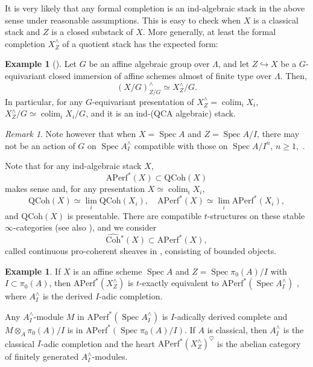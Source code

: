 \documentclass{amsart}
\theoremstyle{definition}
\newtheorem{example}[theorem]{Example}
\theoremstyle{remark}
\newtheorem{remark}[theorem]{Remark}
\numberwithin{equation}{section}
\DeclareMathOperator{\Spec}{Spec}
\DeclareMathOperator{\colim}{colim}
\newcommand{\wh}{\widehat}
\newcommand{\QCoh}{\mathrm{QCoh}}
\newcommand{\Coh}{\mathrm{Coh}}
\newcommand{\Aperf}{\mathrm{APerf}}
\begin{document}
It is very likely that any formal completion is an ind-algebraic stack in the above sense under reasonable assumptions. This is easy to check when $X$ is a classical stack and $Z$ is a closed substack of $X$. More generally, at least the formal completion $X^\wedge_Z$ of a quotient stack has the expected form:

\begin{example}[{\cite[Proposition 7.1.16]{ElmantoKubrakSosnilo}}]
Let $G$ be an affine algebraic group over $\Lambda$, and let $Z\hookrightarrow X$ be a $G$-equivariant closed immersion of affine schemes almost of finite type over $\Lambda$. Then, 
\[
(X/G)^\wedge_{Z/G} \simeq X^\wedge_Z/G.  
\]
In particular, for any $G$-equivariant presentation of $X^\wedge_Z=\colim_i X_i$, $X^\wedge_Z/G\simeq \colim_i X_i/G$, and it is an ind-(QCA algebraic) stack. 
\end{example}

\begin{remark}
Note however that when $X=\Spec A$ and $Z=\Spec A/I$, there may not be an action of $G$ on $\Spec A^\wedge_I$ compatible with those on $\Spec A/I^n$, $n\geq 1$,~\cite[footnote 6]{chendhillon}. 
\end{remark}

Note that for any ind-algebraic stack $X$, 
\[
\Aperf^* (X) \subset \QCoh(X)
\]
makes sense and, for any presentation $X\simeq \colim_i X_i$, 
\[
\QCoh(X)\simeq \lim_i \QCoh(X_i), \quad \Aperf^*(X)\simeq \lim_i\Aperf^*(X_i), 
\]
and $\QCoh(X)$ is presentable. There are compatible $t$-structures on these stable $\infty$-categories (see also \cite[Proposition 2.1.11]{HalpernLeistnerPreygel}), and we consider 
\[
\wh{\Coh}{}^*(X)\subset \Aperf^*(X),
\]
called continuous pro-coherent sheaves in \cite{chendhillon}, consisting of bounded objects. 

\begin{example}
If $X$ is an affine scheme $\Spec A$ and $Z=\Spec \pi_0(A)/I$ with $I\subset \pi_0(A)$, then $\Aperf^*(X^\wedge_Z)$ is $t$-exactly equivalent to $\Aperf^*(\Spec A^\wedge_I)$ \cite[Lemma 2.1.10]{HalpernLeistnerPreygel}, where $A^\wedge_I$ is the derived $I$-adic completion. 

Any $A^\wedge_I$-module $M$ in $\Aperf^*(\Spec A^\wedge_I)$ is $I$-adically derived complete and $M\otimes_A \pi_0(A)/I$ is in $\Aperf^*(\Spec \pi_0(A)/I)$. If $A$ is classical, then $A^\wedge_I$ is the classical $I$-adic completion and the heart $\Aperf^*(X^\wedge_Z)^\heartsuit$ is the abelian category of finitely generated $A^\wedge_I$-modules.
\end{example}
\end{document}
